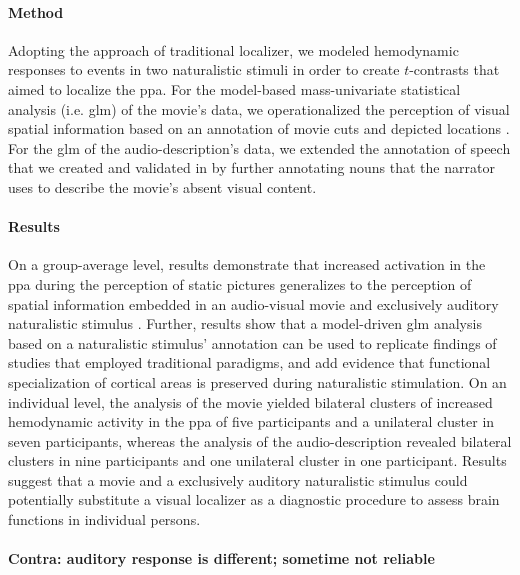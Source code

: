 \paragraph{Method}
Adopting the approach of traditional localizer, we modeled hemodynamic responses
to events in two naturalistic stimuli in order to create $t$-contrasts that
aimed to localize the \ac{ppa}.
For the model-based mass-univariate statistical analysis (i.e. \ac{glm}) of the
movie's data, we operationalized the perception of visual spatial information
based on an annotation of movie cuts and depicted locations
\citep{haeusler2016cutanno}.
For the \ac{glm} of the audio-description's data, we extended the annotation of
speech that we created and validated in \citep{haeusler2021speechanno} by
further annotating nouns that the narrator uses to describe the movie's absent
visual content.


\paragraph{Results}
On a group-average level, results demonstrate that increased activation in the
\ac{ppa} during the perception of static pictures generalizes to the perception
of spatial information embedded in an audio-visual movie and exclusively
auditory naturalistic stimulus \citep{haeusler2022processing}.
Further, results show that a model-driven \ac{glm} analysis based on a
naturalistic stimulus' annotation can be used to replicate findings of studies
that employed traditional paradigms, and add evidence
\citep[cf.][]{bartels2004mapping} that functional specialization of cortical
areas is preserved during naturalistic stimulation.
On an individual level, the analysis of the movie yielded bilateral clusters of
increased hemodynamic activity in the \ac{ppa} of five participants and a
unilateral cluster in seven participants, whereas the analysis of the
audio-description revealed bilateral clusters in nine participants and one
unilateral cluster in one participant.
Results suggest that a movie and a exclusively auditory naturalistic stimulus
could potentially substitute a visual localizer as a diagnostic procedure to
assess brain functions in individual persons.


\paragraph{Contra: auditory response is different; sometime not reliable}


